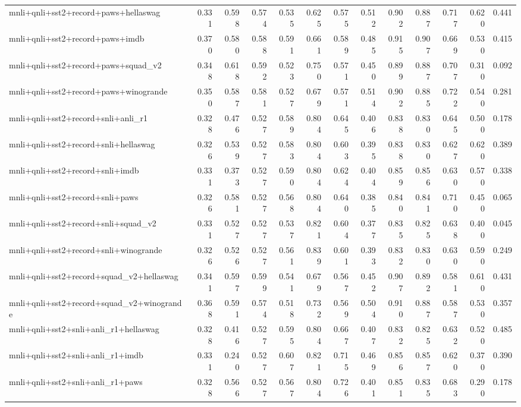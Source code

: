 \begin{table}[t]
\begin{tabular}{lrrrrrrrrrrrr}
    mnli+qnli+sst2+record+paws+hellaswag & 0.331 & 0.598 & 0.574 & 0.535 & 0.625 & 0.575 & 0.512 & 0.902 & 0.887 & 0.717 & 0.620 & 0.441 \\
    mnli+qnli+sst2+record+paws+imdb & 0.370 & 0.580 & 0.588 & 0.591 & 0.661 & 0.589 & 0.485 & 0.915 & 0.907 & 0.669 & 0.530 & 0.415 \\
    mnli+qnli+sst2+record+paws+squad\_v2 & 0.348 & 0.618 & 0.592 & 0.523 & 0.750 & 0.571 & 0.450 & 0.899 & 0.887 & 0.707 & 0.310 & 0.092 \\
    mnli+qnli+sst2+record+paws+winogrande & 0.350 & 0.587 & 0.581 & 0.527 & 0.679 & 0.571 & 0.514 & 0.902 & 0.885 & 0.722 & 0.540 & 0.281 \\
    mnli+qnli+sst2+record+snli+anli\_r1 & 0.328 & 0.476 & 0.527 & 0.589 & 0.804 & 0.645 & 0.406 & 0.838 & 0.830 & 0.645 & 0.500 & 0.178 \\
    mnli+qnli+sst2+record+snli+hellaswag & 0.326 & 0.539 & 0.527 & 0.583 & 0.804 & 0.603 & 0.395 & 0.838 & 0.830 & 0.627 & 0.620 & 0.389 \\
    mnli+qnli+sst2+record+snli+imdb & 0.331 & 0.373 & 0.527 & 0.590 & 0.804 & 0.624 & 0.404 & 0.859 & 0.856 & 0.630 & 0.570 & 0.338 \\
    mnli+qnli+sst2+record+snli+paws & 0.326 & 0.581 & 0.527 & 0.568 & 0.804 & 0.640 & 0.385 & 0.840 & 0.841 & 0.710 & 0.450 & 0.065 \\
    mnli+qnli+sst2+record+snli+squad\_v2 & 0.331 & 0.527 & 0.527 & 0.537 & 0.821 & 0.604 & 0.377 & 0.835 & 0.825 & 0.638 & 0.400 & 0.045 \\
    mnli+qnli+sst2+record+snli+winogrande & 0.326 & 0.526 & 0.527 & 0.561 & 0.839 & 0.601 & 0.393 & 0.832 & 0.830 & 0.630 & 0.590 & 0.249 \\
    mnli+qnli+sst2+record+squad\_v2+hellaswag & 0.341 & 0.597 & 0.599 & 0.541 & 0.679 & 0.567 & 0.452 & 0.907 & 0.892 & 0.581 & 0.610 & 0.431 \\
    mnli+qnli+sst2+record+squad\_v2+winogrande & 0.368 & 0.591 & 0.574 & 0.518 & 0.732 & 0.569 & 0.504 & 0.910 & 0.887 & 0.587 & 0.530 & 0.357 \\
    mnli+qnli+sst2+snli+anli\_r1+hellaswag & 0.328 & 0.416 & 0.527 & 0.595 & 0.804 & 0.667 & 0.407 & 0.832 & 0.825 & 0.632 & 0.520 & 0.485 \\
    mnli+qnli+sst2+snli+anli\_r1+imdb & 0.331 & 0.240 & 0.527 & 0.607 & 0.821 & 0.715 & 0.469 & 0.856 & 0.857 & 0.620 & 0.370 & 0.390 \\
    mnli+qnli+sst2+snli+anli\_r1+paws & 0.328 & 0.566 & 0.527 & 0.567 & 0.804 & 0.726 & 0.401 & 0.851 & 0.835 & 0.683 & 0.290 & 0.178 \\

\end{tabular}
\end{table}
